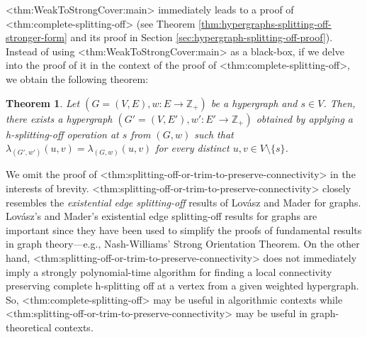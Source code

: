 \documentclass{article}
\def\Cref#1{<#1>}%
\newtheorem{theorem}{Theorem}[section]
\providecommand{\Z}{\mathbb{Z}}
\begin{document}
\Cref{thm:WeakToStrongCover:main} immediately leads to  a proof of \Cref{thm:complete-splitting-off} (see Theorem \ref{thm:hypergraphs-splitting-off-stronger-form} and its proof in Section \ref{sec:hypergraph-splitting-off-proof}). Instead of using \Cref{thm:WeakToStrongCover:main} as a black-box, if we delve into the proof of it in the context of the proof of \Cref{thm:complete-splitting-off}, we obtain the following theorem: 

\begin{theorem}\label{thm:splitting-off-or-trim-to-preserve-connectivity}
    Let $(G=(V, E), w: E\rightarrow \Z_+)$ be a hypergraph and $s\in V$. Then, there exists a hypergraph $(G'=(V, E'), w': E'\rightarrow \Z_+)$ obtained 
    by applying a h-splitting-off operation at $s$ from $(G, w)$ 
    such that $\lambda_{(G', w')}(u, v)=\lambda_{(G, w)}(u, v)$ for every distinct $u, v\in V\setminus \{s\}$. 
\end{theorem}
We omit the proof of \Cref{thm:splitting-off-or-trim-to-preserve-connectivity} in the interests of brevity. 
\Cref{thm:splitting-off-or-trim-to-preserve-connectivity} closely resembles the \emph{existential edge splitting-off} results of Lov\'{a}sz \cite{Lov74, Lovasz-problems-book} and Mader \cite{Mad78} for graphs. Lov\'{a}sz's and Mader's  existential edge splitting-off results for graphs are important since they have been used to simplify the proofs of fundamental results in graph theory---e.g., Nash-Williams' Strong Orientation Theorem. 
On the other hand, \Cref{thm:splitting-off-or-trim-to-preserve-connectivity} does not immediately imply a strongly polynomial-time algorithm for finding a local connectivity preserving complete h-splitting off at a vertex from a given weighted hypergraph. So, \Cref{thm:complete-splitting-off} may be useful in algorithmic contexts while \Cref{thm:splitting-off-or-trim-to-preserve-connectivity} may be useful in graph-theoretical contexts. 
\end{document}
